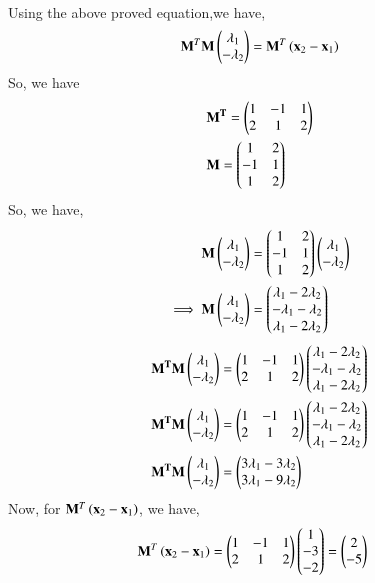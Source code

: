 \documentclass[journal,12pt,twocolumn]{IEEEtran}
\renewcommand\thesection{\arabic{section}}
\begin{document}
\begin{enumerate}[label=\thesection.\arabic*.,ref=\thesection.\theenumi]
\solution\\ Using the above proved equation,we have,
\begin{equation*}
\mathbf{M}^T\mathbf{M}\begin{pmatrix}\lambda_1\\-\lambda_2\end{pmatrix} = \mathbf{M}^T\left(\mathbf{x}_2-\mathbf{x}_1\right)
\end{equation*}
So, we have
\begin{align*}
& \vec{M^T}=\myvec{1 & -1 & 1\\2& 1 & 2}\\
& \vec{M}=\myvec{1 & 2\\ -1 & 1\\ 1 & 2}\ 
\end{align*}
So, we have,
\begin{align*}
\mathbf{M}\begin{pmatrix}\lambda_1\\ -\lambda_2\end{pmatrix}&=\begin{pmatrix}1 & 2\\ -1 & 1\\ 1 & 2\end{pmatrix}\begin{pmatrix}\lambda_1\\ -\lambda_2\end{pmatrix}\\
\implies \mathbf{M}\begin{pmatrix}\lambda_1\\ -\lambda_2\end{pmatrix}&=\begin{pmatrix}\lambda_1-2\lambda_2\\ -\lambda_1-\lambda_2\\\lambda_1-2\lambda_2\end{pmatrix}
\end{align*}
\begin{align*}
&\mathbf{M^T}\mathbf{M}\begin{pmatrix}\lambda_1\\ -\lambda_2\end{pmatrix}=\begin{pmatrix}1 & -1 & 1\\2& 1 & 2\end{pmatrix}\begin{pmatrix}\lambda_1-2\lambda_2\\ -\lambda_1-\lambda_2\\\lambda_1-2\lambda_2\end{pmatrix}\\
& \mathbf{M^T}\mathbf{M}\begin{pmatrix}\lambda_1\\ -\lambda_2\end{pmatrix}=\begin{pmatrix}1 & -1 & 1\\2& 1 & 2\end{pmatrix}\begin{pmatrix}\lambda_1-2\lambda_2\\ -\lambda_1-\lambda_2\\\lambda_1-2\lambda_2\end{pmatrix}\\
& \mathbf{M^T}\mathbf{M}\begin{pmatrix}\lambda_1\\ -\lambda_2\end{pmatrix}=\begin{pmatrix}3\lambda_1-3\lambda_2\\3\lambda_1-9\lambda_2\end{pmatrix}
\end{align*}
Now, for $\mathbf{M}^T\left(\mathbf{x}_2-\mathbf{x}_1\right)$, we have,
\begin{align*}
\vec{M}^T\brak{\vec{x}_2-\vec{x}_1}&=\myvec{1 & -1 & 1\\2& 1 & 2}\myvec{1\\-3\\-2}=\myvec{2\\-5}

\end{align*}
\end{enumerate}
\end{document}

